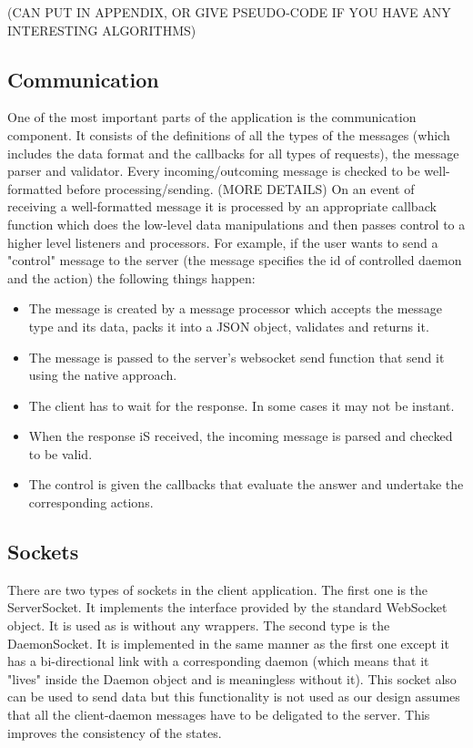 \documentclass{l3proj}
\begin{document}
(CAN PUT IN APPENDIX, OR GIVE PSEUDO-CODE IF YOU HAVE ANY INTERESTING ALGORITHMS)

\subsection{Communication}

One of the most important parts of the application is the communication component. It consists of the definitions of all the types of the messages (which includes the data format and the callbacks for all types of requests), the message parser and validator. Every incoming/outcoming message is checked to be well-formatted before processing/sending. (MORE DETAILS) On an event of receiving a well-formatted message it is processed by an appropriate callback function which does the low-level data manipulations and then passes control to a higher level listeners and processors. For example, if the user wants to send a "control" message to the server (the message specifies the id of controlled daemon and the action) the following things happen:
\begin{itemize}
  \item The message is created by a message processor which accepts the message type and its data, packs it into a JSON object, validates and returns it.
  \item The message is passed to the server's websocket send function that send it using the native approach.
  \item The client has to wait for the response. In some cases it may not be instant.
  \item When the response iS received, the incoming message is parsed and checked to be valid.
  \item The control is given the callbacks that evaluate the answer and undertake the corresponding actions.
\end{itemize}

\subsection{Sockets}

There are two types of sockets in the client application. The first one is the ServerSocket. It implements the interface provided by the standard WebSocket object. It is used as is without any wrappers. The second type is the DaemonSocket. It is implemented in the same manner as the first one except it has a bi-directional link with a corresponding daemon (which means that it "lives" inside the Daemon object and is meaningless without it). This socket also can be used to send data but this functionality is not used as our design assumes that all the client-daemon messages have to be deligated to the server. This improves the consistency of the states.
\end{document}
